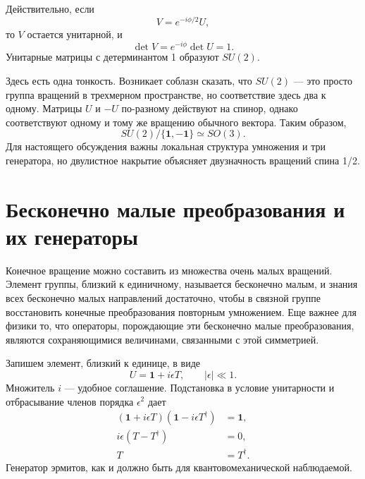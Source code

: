 \begin{classroomqa}
\end{classroomqa}

Действительно, если
\begin{equation}
V=e^{-i\phi/2}U,
\end{equation}
то \(V\) остается унитарной, и
\begin{equation}
\det V=e^{-i\phi}\det U=1.
\end{equation}
Унитарные матрицы с детерминантом 1 образуют \(SU(2)\).

Здесь есть одна тонкость. Возникает соблазн сказать, что \(SU(2)\) — это просто группа вращений в трехмерном пространстве, но соответствие здесь два к одному. Матрицы \(U\) и \(-U\) по-разному действуют на спинор, однако соответствуют одному и тому же вращению обычного вектора. Таким образом,
\begin{equation}
SU(2)/\{\boldsymbol 1,-\boldsymbol 1\}\simeq SO(3).
\end{equation}
Для настоящего обсуждения важны локальная структура умножения и три генератора, но двулистное накрытие объясняет двузначность вращений спина 1/2.

\section{Бесконечно малые преобразования и их генераторы}

Конечное вращение можно составить из множества очень малых вращений. Элемент группы, близкий к единичному, называется бесконечно малым, и знания всех бесконечно малых направлений достаточно, чтобы в связной группе восстановить конечные преобразования повторным умножением. Еще важнее для физики то, что операторы, порождающие эти бесконечно малые преобразования, являются сохраняющимися величинами, связанными с этой симметрией.

Запишем элемент, близкий к единице, в виде
\begin{equation}
U=\boldsymbol 1+i\epsilon T,
\qquad |\epsilon|\ll1.
\label{eq:l4-infinitesimal-u}
\end{equation}
Множитель \(i\) — удобное соглашение. Подстановка в условие унитарности и отбрасывание членов порядка \(\epsilon^2\) дает
\begin{align}
(\boldsymbol 1+i\epsilon T)
(\boldsymbol 1-i\epsilon T^\dagger)&=\boldsymbol 1,
\\
i\epsilon(T-T^\dagger)&=0,
\\
T&=T^\dagger.
\label{eq:l4-hermitian-generator}
\end{align}
Генератор эрмитов, как и должно быть для квантовомеханической наблюдаемой.

